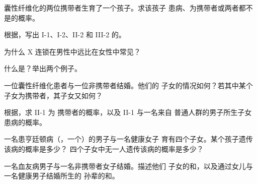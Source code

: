 \begin{exercise}[$\star$]\label{exo:g11:genes-and-disease:2}
囊性纤维化的两位携带者生育了一个孩子。求该孩子
患病、为携带者或两者都不是的概率。
\end{exercise}

\begin{exercise}[$\star$]\label{exo:g11:genes-and-disease:3}
根据，写出 I-1、I-2、II-2 和
III-2 的。
\end{exercise}

\begin{exercise}[$\star$]\label{exo:g11:genes-and-disease:4}
为什么 X 连锁在男性中远比在女性中常见？
\end{exercise}

\begin{exercise}[$\star$]\label{exo:g11:genes-and-disease:5}
什么是？举出两个例子。
\end{exercise}

\begin{exercise}[$\star\star$]\label{exo:g11:genes-and-disease:6}
一位囊性纤维化患者与一位非携带者结婚。他们的
子女的情况如何？若其中某个子女为携带者，其子女又如何？
\end{exercise}

\begin{exercise}[$\star\star$]\label{exo:g11:genes-and-disease:7}
根据，求 II-1 为
携带者的概率，以及 II-1 与一名来自
普通人群的男子所生子女患病的概率。
\end{exercise}

\begin{exercise}[$\star\star$]\label{exo:g11:genes-and-disease:8}
一名患亨廷顿病（，一个）的男子与一名健康女子
育有四个子女。某个孩子遗传该病的概率是多少？
四个子女中无一人遗传该病的概率是多少？
\end{exercise}

\begin{exercise}[$\star\star$]\label{exo:g11:genes-and-disease:9}
一名血友病男子与一名非携带者女子结婚。描述他们
子女的和，以及通过女儿与一名健康男子结婚所生的
孙辈的和。
\end{exercise}

